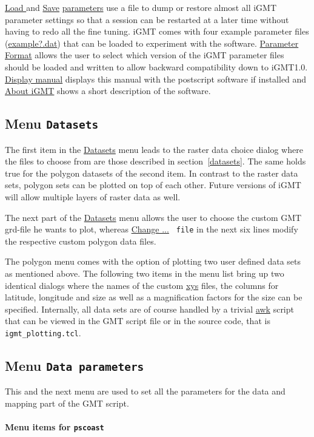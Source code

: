 \documentclass[11pt]{article}
\begin{document}
\url{Load } and \url{Save} \url{parameters} use a file to dump or
restore almost all iGMT parameter settings so that a session can be
restarted at a later time without having to redo all the fine tuning.
iGMT comes with four example parameter files (\url{example?.dat}) that
can be loaded to experiment with the software.  \url{Parameter Format}
allows the user to select which version of the iGMT parameter files
should be loaded and written to allow backward compatibility down to
iGMT1.0.  \url{Display manual} displays this manual with the
postscript software if installed and \url{About iGMT} shows a short
description of the software.


\subsection{Menu {\tt Datasets}\label{datasetsmenu}}

The first item in the \url{Datasets} menu leads to the raster data
choice dialog where the files to choose from are those described in
section~\ref{datasets}. The same holds true for the polygon datasets
of the second item. In contrast to the raster data sets, polygon sets
can be plotted on top of each other. Future versions of iGMT will
allow multiple layers of raster data as well.

The next part of the \url{Datasets} menu allows the user to choose the
custom GMT grd-file he wants to plot, whereas \url{Change ...} {\tt
  file} in the next six lines modify the respective custom polygon
data files.

 
The polygon menu comes with the option of plotting two user defined
data sets as mentioned above. The following two items in the menu list
bring up two identical dialogs where the names of the custom \url{xys}
files, the columns for latitude, longitude and size as well as a
magnification factors for the size can be specified. Internally, all
data sets are of course handled by a trivial \url{awk} script that can
be viewed in the GMT script file or in the source code, that is {\tt
  igmt\_plotting.tcl}.


\subsection{Menu {\tt Data parameters}}
This and the next menu are used to set all the parameters for the data
and mapping part of the GMT script. 

\paragraph{Menu items for {\tt pscoast}}
\end{document}
